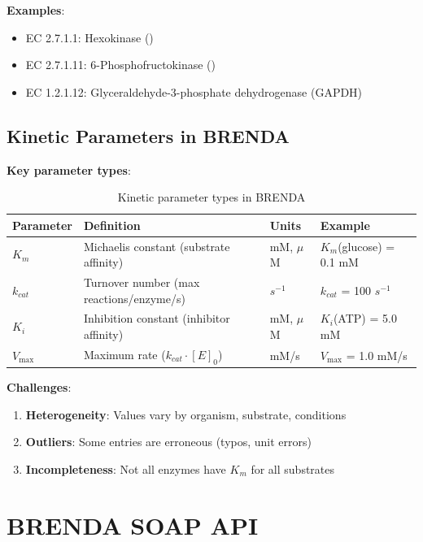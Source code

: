 \textbf{Examples}:

\begin{itemize}
    \item EC 2.7.1.1: Hexokinase ()
    \item EC 2.7.1.11: 6-Phosphofructokinase ()
    \item EC 1.2.1.12: Glyceraldehyde-3-phosphate dehydrogenase (GAPDH)
\end{itemize}

\subsection{Kinetic Parameters in BRENDA}
\label{subsec:brenda-kinetic-parameters}

\textbf{Key parameter types}:

\begin{table}[h]
\centering
\begin{tabular}{@{}llll@{}}
\toprule
\textbf{Parameter} & \textbf{Definition} & \textbf{Units} & \textbf{Example} \\
\midrule
$K_m$ & Michaelis constant (substrate affinity) & mM, $\mu$M & $K_m$(glucose) = 0.1 mM \\
$k_{cat}$ & Turnover number (max reactions/enzyme/s) & $s^{-1}$ & $k_{cat}$ = 100 $s^{-1}$ \\
$K_i$ & Inhibition constant (inhibitor affinity) & mM, $\mu$M & $K_i$(ATP) = 5.0 mM \\
$V_{\max}$ & Maximum rate ($k_{cat} \cdot [E]_0$) & mM/s & $V_{\max}$ = 1.0 mM/s \\
\bottomrule
\end{tabular}
\caption{Kinetic parameter types in BRENDA}
\label{tab:brenda-parameters}
\end{table}

\textbf{Challenges}:

\begin{enumerate}
    \item \textbf{Heterogeneity}: Values vary by organism, substrate, conditions
    \item \textbf{Outliers}: Some entries are erroneous (typos, unit errors)
    \item \textbf{Incompleteness}: Not all enzymes have $K_m$ for all substrates
\end{enumerate}

\section{BRENDA SOAP API}
\label{sec:brenda-soap-api}

